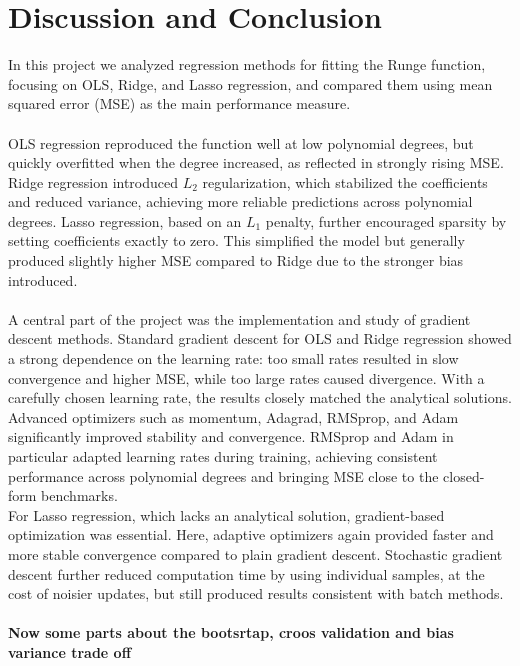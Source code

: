 \documentclass[
 reprint,            %
 amsmath,amssymb,
 aps,
]{revtex4-2}
\begin{document}
\section{Discussion and Conclusion}
\label{sec:Discussion_and_Conclusion}
In this project we analyzed regression methods for fitting the Runge function, focusing on OLS, Ridge, and Lasso regression, and compared them using mean squared error (MSE) as the main performance measure.\\\\

OLS regression reproduced the function well at low polynomial degrees, but quickly overfitted when the degree increased, as reflected in strongly rising MSE.
Ridge regression introduced $L_2$ regularization, which stabilized the coefficients and reduced variance, achieving more reliable predictions across polynomial degrees.
Lasso regression, based on an $L_1$ penalty, further encouraged sparsity by setting coefficients exactly to zero.
This simplified the model but generally produced slightly higher MSE compared to Ridge due to the stronger bias introduced.\\\\

A central part of the project was the implementation and study of gradient descent methods.
Standard gradient descent for OLS and Ridge regression showed a strong dependence on the learning rate: too small rates resulted in slow convergence and higher MSE, while too large rates caused divergence.
With a carefully chosen learning rate, the results closely matched the analytical solutions.
Advanced optimizers such as momentum, Adagrad, RMSprop, and Adam significantly improved stability and convergence.
RMSprop and Adam in particular adapted learning rates during training, achieving consistent performance across polynomial degrees and bringing MSE close to the closed-form benchmarks.\\
For Lasso regression, which lacks an analytical solution, gradient-based optimization was essential.
Here, adaptive optimizers again provided faster and more stable convergence compared to plain gradient descent.
Stochastic gradient descent further reduced computation time by using individual samples, at the cost of noisier updates, but still produced results consistent with batch methods.\\\\

\textbf{Now some parts about the bootsrtap, croos validation and bias variance trade off}



\end{document}
